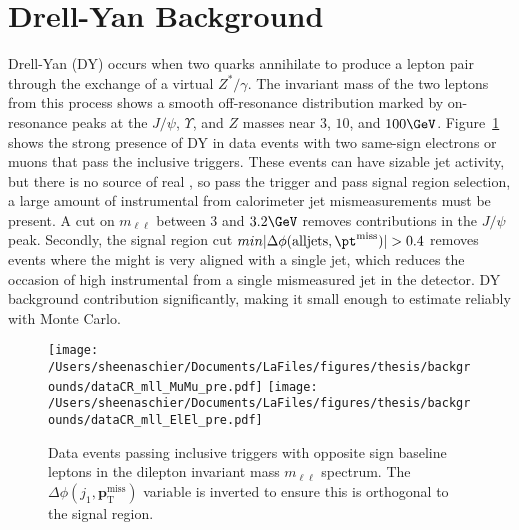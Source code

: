 \section{Drell-Yan Background}
\label{sec:bkg:dy}
Drell-Yan (DY) occurs when two quarks annihilate to produce a lepton pair through the exchange of a virtual $Z^*/\gamma$.  The invariant mass of the two leptons from this process shows a smooth off-resonance distribution marked by on-resonance peaks at the $J/\psi$, $\Upsilon$, and $Z$ masses near $3$, $10$, and $100\GeV$.  Figure~\ref{fig:mll_dy} shows the strong presence of DY in data events with two same-sign electrons or muons that pass the inclusive \met triggers.  These events can have sizable jet activity, but there is no source of real \met{}, so pass the \met{} trigger and pass signal region selection, a large amount of instrumental \met{} from calorimeter jet mismeasurements must be present.  A cut on $m_{\ell\ell}$ between $3$ and $3.2\GeV$ removes contributions in the $J/\psi$ peak.  Secondly, the signal region cut $min|\Delta\phi(\mathrm{all jets}, \pt^\mathrm{miss})|>0.4$ removes events where the might is very aligned with a single jet, which reduces the occasion of high instrumental \met from a single mismeasured jet in the detector.  DY background contribution significantly, making it small enough to estimate reliably with Monte Carlo. 

 \begin{figure}
 \centering
    \texttt{[image: /Users/sheenaschier/Documents/LaFiles/figures/thesis/backgrounds/dataCR\_mll\_MuMu\_pre.pdf]}
 \texttt{[image: /Users/sheenaschier/Documents/LaFiles/figures/thesis/backgrounds/dataCR\_mll\_ElEl\_pre.pdf]}
  \caption{Data events passing inclusive \met{} triggers with opposite sign baseline leptons in the dilepton invariant mass $m_{\ell\ell}$ spectrum. The $\Delta\phi(j_1, \mathbf{p}_\mathrm{    T}^\mathrm{miss})$ variable is inverted to ensure this is orthogonal to the signal region.}
  \label{fig:mll_dy}
 \end{figure}
\FloatBarrier



